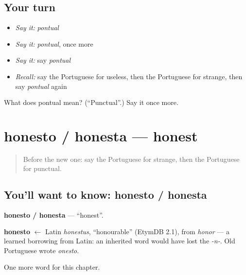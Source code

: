 \subsection*{Your turn}
\begin{itemize}
\raggedright
  \item \emph{Say it:} \emph{pontual}
  \item \emph{Say it:} \emph{pontual}, once more
  \item \emph{Say it:} say \emph{pontual}
  \item \emph{Recall:} say the Portuguese for useless, then the Portuguese for strange, then say \emph{pontual} again
\end{itemize}

\begin{tcolorbox}[breakable,colback=teal!4,colframe=teal!35!black,title={Before you move on}]
What does pontual mean? (\textquotedblleft{}Punctual\textquotedblright{}.) Say it once more.
\end{tcolorbox}
\section[honesto / honesta]{honesto / honesta — honest}

\label{lesson:PT-C155-honesto-honesta}



\begin{quote}
Before the new one: say the Portuguese for strange, then the Portuguese for punctual.
\end{quote}

\subsection*{You'll want to know: honesto / honesta}
\textbf{honesto / honesta} — \textquotedblleft{}honest\textquotedblright{}.

\begin{cousinweb}
\textbf{honesto} $\leftarrow$ Latin \emph{honestus}, \textquotedblleft{}honourable\textquotedblright{} (EtymDB 2.1), from \emph{honor} — a learned borrowing from Latin: an inherited word would have lost the \emph{-n-}. Old Portuguese wrote \emph{onesto}.
\end{cousinweb}

\begin{grammarlens}[title={What you've built}]
One more word for this chapter.
\end{grammarlens}

